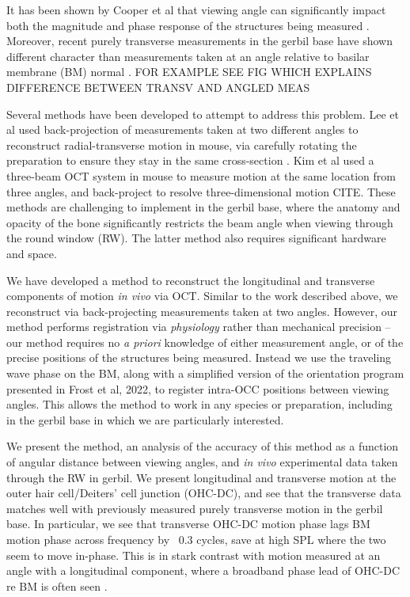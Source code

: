 \documentclass[preprint,NumberedRefs]{JASA}
\begin{document}
\par{It has been shown by Cooper et al that viewing angle can significantly impact both the magnitude and phase response of the structures being measured \citep{cooper2018}. Moreover, recent purely transverse measurements in the gerbil base have shown different character than measurements taken at an angle relative to basilar membrane (BM) normal \citep{Puria2022}. FOR EXAMPLE SEE FIG WHICH EXPLAINS DIFFERENCE BETWEEN TRANSV AND ANGLED MEAS}
\par{Several methods have been developed to attempt to address this problem. Lee et al used back-projection of measurements taken at two different angles to reconstruct radial-transverse motion in mouse, via carefully rotating the preparation to ensure they stay in the same cross-section \citep{lee}. Kim et al used a three-beam OCT system in mouse to measure motion at the same location from three angles, and back-project to resolve three-dimensional motion CITE. These methods are challenging to implement in the gerbil base, where the anatomy and opacity of the bone significantly restricts the beam angle when viewing through the round window (RW). The latter method also requires significant hardware and space.}
\par{We have developed a method to reconstruct the longitudinal and transverse components of motion \textit{in vivo} via OCT. Similar to the work described above, we reconstruct via back-projecting measurements taken at two angles. However, our method performs registration via \textit{physiology} rather than mechanical precision -- our method requires no \textit{a priori} knowledge of either measurement angle, or of the precise positions of the structures being measured. Instead we use the traveling wave phase on the BM, along with a simplified version of the orientation program presented in Frost et al, 2022, to register intra-OCC positions between viewing angles. This allows the method to work in any species or preparation, including in the gerbil base in which we are particularly interested.}
\par{We present the method, an analysis of the accuracy of this method as a function of angular distance between viewing angles, and \textit{in vivo} experimental data taken through the RW in gerbil. We present longitudinal and transverse motion at the outer hair cell/Deiters' cell junction (OHC-DC), and see that the transverse data matches well with previously measured purely transverse motion in the gerbil base. In particular, we see that transverse OHC-DC motion phase lags BM motion phase across frequency by ~0.3 cycles, save at high SPL where the two seem to move in-phase. This is in stark contrast with motion measured at an angle with a longitudinal component, where a broadband phase lead of OHC-DC re BM is often seen \citep{frost2022}.}
\end{document}
